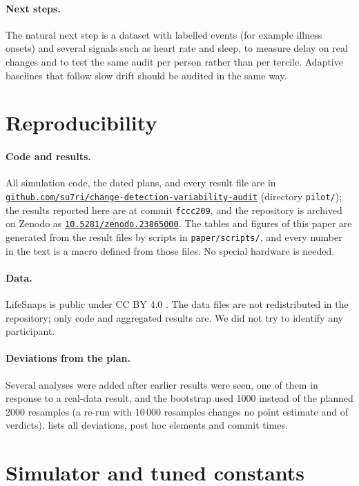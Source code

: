\documentclass[11pt,a4paper]{article}
\newcommand{\zenodoDOI}{\href{https://doi.org/10.5281/zenodo.23865000}{\texttt{10.5281/zenodo.23865000}}}
\newcommand{\repo}{\href{https://github.com/su7ri/change-detection-variability-audit}{\nolinkurl{github.com/su7ri/change-detection-variability-audit}}}
\newcommand{\commit}{\texttt{fccc209}}
\begin{document}
\paragraph{Next steps.}
The natural next step is a dataset with labelled events (for example illness onsets) and several signals such as heart rate and sleep, to measure delay on real changes and to test the same audit per person rather than per tercile. Adaptive baselines that follow slow drift \citep{gama2014} should be audited in the same way.

\FloatBarrier
\section{Reproducibility}\label{sec:reproducibility}
\paragraph{Code and results.}
All simulation code, the dated plans, and every result file are in \repo{} (directory \texttt{pilot/}); the results reported here are at commit \commit{}, and the repository is archived on Zenodo as \zenodoDOI. The tables and figures of this paper are generated from the result files by scripts in \texttt{paper/\allowbreak scripts/}, and every number in the text is a macro defined from those files. No special hardware is needed.
\paragraph{Data.}
LifeSnaps is public under CC BY 4.0 \citep{lifesnaps_zenodo}. The data files are not redistributed in the repository; only code and aggregated results are. We did not try to identify any participant.
\paragraph{Deviations from the plan.}
Several analyses were added after earlier results were seen, one of them in response to a real-data result, and the bootstrap used 1000 instead of the planned 2000 resamples (a re-run with 10\,000 resamples changes no point estimate and \McChanges{} of \McWithVerdict{} verdicts).  lists all deviations, post hoc elements and commit times.




\appendix
\FloatBarrier
\section{Simulator and tuned constants}\label{app:sim}
\end{document}
